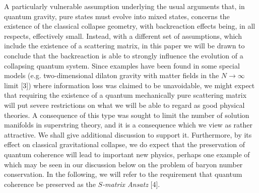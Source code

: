 A particularly vulnerable assumption underlying the usual arguments
that, in quantum gravity, pure states must evolve into mixed states,
concerns the existence of the classical collapse geometry, with
backreaction effects being, in all respects, effectively small.
Instead, with a different set of assumptions, which include the
existence of a scattering matrix, in this paper we will be drawn to
conclude that the backreaction is able to strongly influence the
evolution of a collapsing quantum system. Since examples have been
found in some special models (e.g. two-dimensional dilaton gravity with
matter fields in the $N\rightarrow \infty$ limit [3]) where information
loss was claimed to be unavoidable, we might expect that requiring the
existence of a quantum mechanically pure scattering matrix will put
severe restrictions on what we will be able to regard as good physical
theories.  A consequence of this type was sought to limit the number of
solution manifolds in superstring theory, and it is a consequence which
we view as rather attractive.  We shall give additional discussion to
support it.  Furthermore, by its effect on classical gravitational
collapse, we do expect that the preservation of quantum coherence will
lead to important new physics, perhaps one example of which may be seen
in our discussion below on the problem of baryon number conservation.
In the following, we will refer to the requirement that quantum
coherence be preserved as the {\it $S$-matrix Ansatz} [4].

